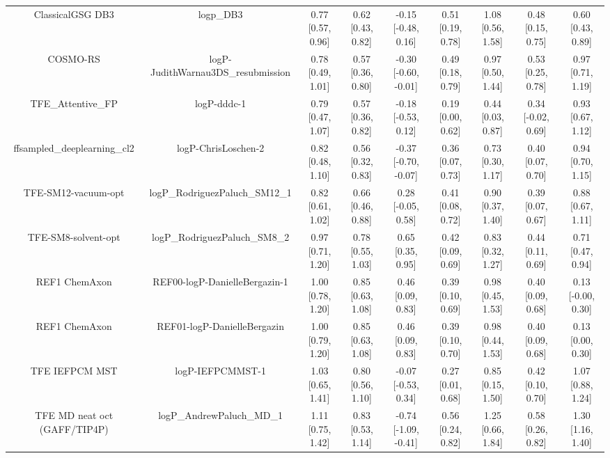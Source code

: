 \documentclass{article}
\begin{document}
\begin{center}
\begin{longtable}{|ccccccccc|}
             ClassicalGSG DB3 &                                      logp\_DB3 &  0.77 [0.57, 0.96] &  0.62 [0.43, 0.82] &   -0.15 [-0.48, 0.16] &  0.51 [0.19, 0.78] &     1.08 [0.56, 1.58] &     0.48 [0.15, 0.75] &     0.60 [0.43, 0.89] \\
                     COSMO-RS &             logP-JudithWarnau3DS\_resubmission &  0.78 [0.49, 1.01] &  0.57 [0.36, 0.80] &  -0.30 [-0.60, -0.01] &  0.49 [0.18, 0.79] &     0.97 [0.50, 1.44] &     0.53 [0.25, 0.78] &     0.97 [0.71, 1.19] \\
             TFE_Attentive_FP &                                    logP-dddc-1 &  0.79 [0.47, 1.07] &  0.57 [0.36, 0.82] &   -0.18 [-0.53, 0.12] &  0.19 [0.00, 0.62] &     0.44 [0.03, 0.87] &    0.34 [-0.02, 0.69] &     0.93 [0.67, 1.12] \\
   ffsampled_deeplearning_cl2 &                            logP-ChrisLoschen-2 &  0.82 [0.48, 1.10] &  0.56 [0.32, 0.83] &  -0.37 [-0.70, -0.07] &  0.36 [0.07, 0.73] &     0.73 [0.30, 1.17] &     0.40 [0.07, 0.70] &     0.94 [0.70, 1.15] \\
          TFE-SM12-vacuum-opt &                 logP\_RodriguezPaluch\_SM12\_1 &  0.82 [0.61, 1.02] &  0.66 [0.46, 0.88] &    0.28 [-0.05, 0.58] &  0.41 [0.08, 0.72] &     0.90 [0.37, 1.40] &     0.39 [0.07, 0.67] &     0.88 [0.67, 1.11] \\
          TFE-SM8-solvent-opt &                  logP\_RodriguezPaluch\_SM8\_2 &  0.97 [0.71, 1.20] &  0.78 [0.55, 1.03] &     0.65 [0.35, 0.95] &  0.42 [0.09, 0.69] &     0.83 [0.32, 1.27] &     0.44 [0.11, 0.69] &     0.71 [0.47, 0.94] \\
                REF1 ChemAxon &                  REF00-logP-DanielleBergazin-1 &  1.00 [0.78, 1.20] &  0.85 [0.63, 1.08] &     0.46 [0.09, 0.83] &  0.39 [0.10, 0.69] &     0.98 [0.45, 1.53] &     0.40 [0.09, 0.68] &    0.13 [-0.00, 0.30] \\
                REF1 ChemAxon &                    REF01-logP-DanielleBergazin &  1.00 [0.79, 1.20] &  0.85 [0.63, 1.08] &     0.46 [0.09, 0.83] &  0.39 [0.10, 0.70] &     0.98 [0.44, 1.53] &     0.40 [0.09, 0.68] &     0.13 [0.00, 0.30] \\
               TFE IEFPCM MST &                               logP-IEFPCMMST-1 &  1.03 [0.65, 1.41] &  0.80 [0.56, 1.10] &   -0.07 [-0.53, 0.34] &  0.27 [0.01, 0.68] &     0.85 [0.15, 1.50] &     0.42 [0.10, 0.70] &     1.07 [0.88, 1.24] \\
 TFE MD neat oct (GAFF/TIP4P) &                      logP\_AndrewPaluch\_MD\_1 &  1.11 [0.75, 1.42] &  0.83 [0.53, 1.14] &  -0.74 [-1.09, -0.41] &  0.56 [0.24, 0.82] &     1.25 [0.66, 1.84] &     0.58 [0.26, 0.82] &     1.30 [1.16, 1.40] \\

\end{longtable}
\end{center}
\end{document}
